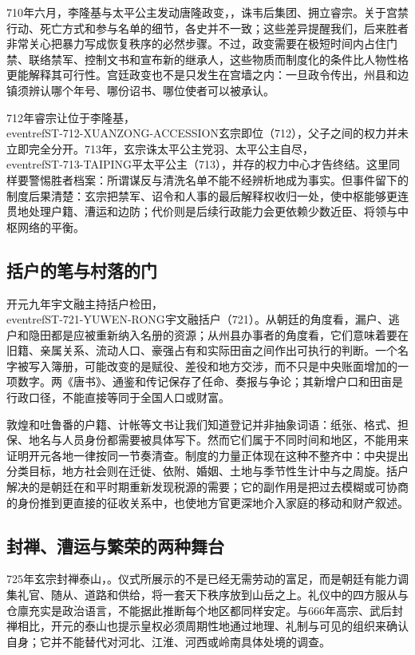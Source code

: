 710年六月，李隆基与太平公主发动唐隆政变，，诛韦后集团、拥立睿宗。关于宫禁行动、死亡方式和参与名单的细节，各史并不一致；这些差异提醒我们，后来胜者非常关心把暴力写成恢复秩序的必然步骤。不过，政变需要在极短时间内占住门禁、联络禁军、控制文书和宣布新的继承人，这些物质而制度化的条件比人物性格更能解释其可行性。宫廷政变也不是只发生在宫墙之内：一旦政令传出，州县和边镇须辨认哪个年号、哪份诏书、哪位使者可以被承认。

712年睿宗让位于李隆基，\\eventref{ST-712-XUANZONG-ACCESSION}{玄宗即位（712）}，父子之间的权力并未立即完全分开。713年，玄宗诛太平公主党羽、太平公主自尽，\\eventref{ST-713-TAIPING}{平太平公主（713）}，并存的权力中心才告终结。这里同样要警惕胜者档案：所谓谋反与清洗名单不能不经辨析地成为事实。但事件留下的制度后果清楚：玄宗把禁军、诏令和人事的最后解释权收归一处，使中枢能够更连贯地处理户籍、漕运和边防；代价则是后续行政能力会更依赖少数近臣、将领与中枢网络的平衡。

\subsection{括户的笔与村落的门}
开元九年宇文融主持括户检田，\\eventref{ST-721-YUWEN-RONG}{宇文融括户（721）}。从朝廷的角度看，漏户、逃户和隐田都是应被重新纳入名册的资源；从州县办事者的角度看，它们意味着要在旧籍、亲属关系、流动人口、豪强占有和实际田亩之间作出可执行的判断。一个名字被写入簿册，可能改变的是赋役、差役和地方交涉，而不只是中央账面增加的一项数字。两《唐书》、通鉴和传记保存了任命、奏报与争论；其新增户口和田亩是行政口径，不能直接等同于全国人口或财富。

敦煌和吐鲁番的户籍、计帐等文书让我们知道登记并非抽象词语：纸张、格式、担保、地名与人员身份都需要被具体写下。然而它们属于不同时间和地区，不能用来证明开元各地一律按同一节奏清查。制度的力量正体现在这种不整齐中：中央提出分类目标，地方社会则在迁徙、依附、婚姻、土地与季节性生计中与之周旋。括户解决的是朝廷在和平时期重新发现税源的需要；它的副作用是把过去模糊或可协商的身份推到更直接的征收关系中，也使地方官更深地介入家庭的移动和财产叙述。

\subsection{封禅、漕运与繁荣的两种舞台}
725年玄宗封禅泰山，。仪式所展示的不是已经无需劳动的富足，而是朝廷有能力调集礼官、随从、道路和供给，将一套天下秩序放到山岳之上。礼仪中的四方服从与仓廪充实是政治语言，不能据此推断每个地区都同样安定。与666年高宗、武后封禅相比，开元的泰山也提示皇权必须周期性地通过地理、礼制与可见的组织来确认自身；它并不能替代对河北、江淮、河西或岭南具体处境的调查。

